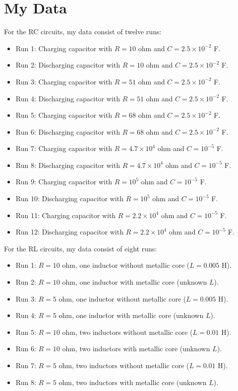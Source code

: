 \section{My Data}
For the RC circuits, my data consist of twelve runs:
\begin{itemize}
    \item Run 1: Charging capacitor with $R = 10$ ohm and $C = 2.5 \times 10^{-2}$ F.
	\item Run 2: Discharging capacitor with $R = 10$ ohm and $C = 2.5 \times 10^{-2}$ F.
	\item Run 3: Charging capacitor with $R = 51$ ohm and $C = 2.5 \times 10^{-2}$ F.
	\item Run 4: Discharging capacitor with $R = 51$ ohm and $C = 2.5 \times 10^{-2}$ F.
	\item Run 5: Charging capacitor with $R = 68$ ohm and $C = 2.5 \times 10^{-2}$ F.
	\item Run 6: Discharging capacitor with $R = 68$ ohm and $C = 2.5 \times 10^{-2}$ F.
	\item Run 7: Charging capacitor with $R = 4.7 \times 10^{4}$ ohm and $C = 10^{-5}$ F.
	\item Run 8: Discharging capacitor with $R = 4.7 \times 10^{4}$ ohm and $C = 10^{-5}$ F.
	\item Run 9: Charging capacitor with $R = 10^{5}$ ohm and $C = 10^{-5}$ F.
	\item Run 10: Discharging capacitor with $R = 10^{5}$ ohm and $C = 10^{-5}$ F.
	\item Run 11: Charging capacitor with $R = 2.2 \times 10^{4}$ ohm and $C = 10^{-5}$ F.
	\item Run 12: Discharging capacitor with $R = 2.2 \times 10^{4}$ ohm and $C = 10^{-5}$ F.
\end{itemize}
For the RL circuits, my data consist of eight runs:
\begin{itemize}
    \item Run 1: $R = 10$ ohm, one inductor without metallic core ($L = 0.005$ H).
    \item Run 2: $R = 10$ ohm, one inductor with metallic core (unknown $L$).
    \item Run 3: $R = 5$ ohm, one inductor without metallic core ($L = 0.005$ H).
    \item Run 4: $R = 5$ ohm, one inductor with metallic core (unknown $L$).
    \item Run 5: $R = 10$ ohm, two inductors without metallic core ($L = 0.01$ H).
    \item Run 6: $R = 10$ ohm, two inductors with metallic core (unknown $L$).
    \item Run 7: $R = 5$ ohm, two inductors without metallic core ($L = 0.01$ H).
    \item Run 8: $R = 5$ ohm, two inductors with metallic core (unknown $L$).
\end{itemize}
